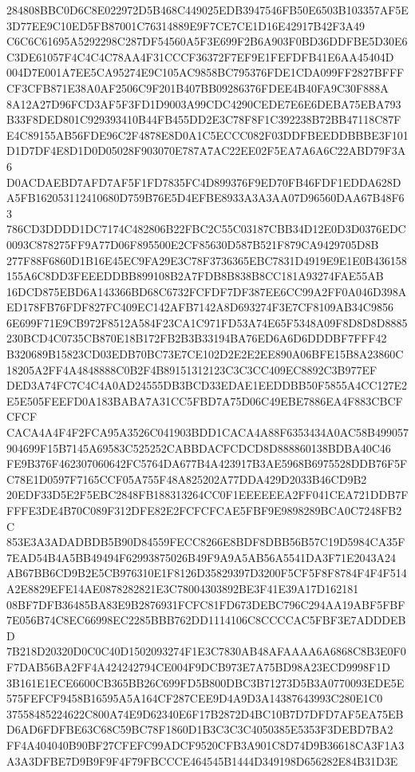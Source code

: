 \documentclass[UTF8,fontset=fandol,zihao=-4,a4paper]{ctexart}
\begin{document}
{{284808BBC0D6C8E022972D5B468C449025EDB3947546FB50E6503B103357AF5E3D77EE9C10ED5FB87001C76314889E9F7CE7CE1D16E42917B42F3A49
C6C6C61695A5292298C287DF54560A5F3E699F2B6A903F0BD36DDFBE5D30E6C3DE61057F4C4C4C78AA4F31CCCF36372F7EF9E1FEFDFB41E6AA45404D
004D7E001A7EE5CA95274E9C105AC9858BC795376FDE1CDA099FF2827BFFFCF3CFB871E38A0AF2506C9F201B407BB09286376FDEE4B40FA9C30F888A
8A12A27D96FCD3AF5F3FD1D9003A99CDC4290CEDE7E6E6DEBA75EBA793B33F8DED801C929393410B44FB455DD2E3C78F8F1C392238B72BB47118C87F
E4C89155AB56FDE96C2F4878E8D0A1C5ECCC082F03DDFBEEDDBBBE3F101D1D7DF4E8D1D0D05028F903070E787A7AC22EE02F5EA7A6A6C22ABD79F3A6
D0ACDAEBD7AFD7AF5F1FD7835FC4D899376F9ED70FB46FDF1EDDA628DA5FB162053112410680D759B76E5D4EFBE8933A3A3AA07D96560DAA67B48F63
786CD3DDDD1DC7174C482806B22FBC2C55C03187CBB34D12E0D3D0376EDC0093C878275FF9A77D06F895500E2CF85630D587B521F879CA9429705D8B
277F88F6860D1B16E45EC9FA29E3C78F3736365EBC7831D4919E9E1E0B436158155A6C8DD3FEEEDDBB899108B2A7FDB8B838B8CC181A93274FAE55AB
16DCD875EBD6A143366BD68C6732FCFDF7DF387EE6CC99A2FF0A046D398AED178FB76FDF827FC409EC142AFB7142A8D693274F3E7CF8109AB34C9856
6E699F71E9CB972F8512A584F23CA1C971FD53A74E65F5348A09F8D8D8D8885230BCD4C0735CB870E18B172FB2B3B33194BA76ED6A6D6DDDBF7FFF42
B320689B15823CD03EDB70BC73E7CE102D2E2E2EE890A06BFE15B8A23860C18205A2FF4A4848888C0B2F4B89151312123C3C3CC409EC8892C3B977EF
DED3A74FC7C4C4A0AD24555DB3BCD33EDAE1EEDDBB50F5855A4CC127E2E5E505FEEFD0A183BABA7A31CC5FBD7A75D06C49EBE7886EA4F883CBCFCFCF
CACA4A4F4F2FCA95A3526C041903BDD1CACA4A88F6353434A0AC58B499057904699F15B7145A69583C525252CABBDACFCDCD8D888860138BDBA40C46
FE9B376F462307060642FC5764DA677B4A423917B3AE5968B6975528DDB76F5FC78E1D0597F7165CCF05A755F48A825202A77DDA429D2033B46CD9B2
20EDF33D5E2F5EBC2848FB188313264CC0F1EEEEEEA2FF041CEA721DDB7FFFFE3DE4B70C089F312DFE82E2FCFCFCAE5FBF9E9898289BCA0C7248FB2C
853E3A3ADADBDB5B90D84559FECC8266E8BDF8DBB56B57C19D5984CA35F7EAD54B4A5BB49494F62993875026B49F9A9A5AB56A5541DA3F71E2043A24
AB67BB6CD9B2E5CB976310E1F8126D35829397D3200F5CF5F8F8784F4F4F514A2E8829EFE14AE0878282821E3C78004303892BE3F41E39A17D162181
08BF7DFB36485BA83E9B2876931FCFC81FD673DEBC796C294AA19ABF5FBF7E056B74C8EC66998EC2285BBB762DD1114106C8CCCCAC5FBF3E7ADDDEBD
7B218D20320D0C0C40D1502093274F1E3C7830AB48AFAAAA6A6868C8B3E0F0F7DAB56BA2FF4A424242794CE004F9DCB973E7A75BD98A23ECD9998F1D
3B161E1ECE6600CB365BB26C699FD5B800DBC3B71273D5B3A0770093EDE5E575FEFCF9458B16595A5A164CF287CEE9D4A9D3A14387643993C280E1C0
37558485224622C800A74E9D62340E6F17B2872D4BC10B7D7DFD7AF5EA75EBD6AD6FDFBE63C68C59BC78F1860D1B3C3C3C4050385E5353F3DEBD7BA2
FF4A404040B90BF27CFEFC99ADCF9520CFB3A901C8D74D9B36618CA3F1A3A3A3DFBE7D9B9F9F4F79FBCCCE464545B1444D349198D656282E84B31D3E
}}
\end{document}
